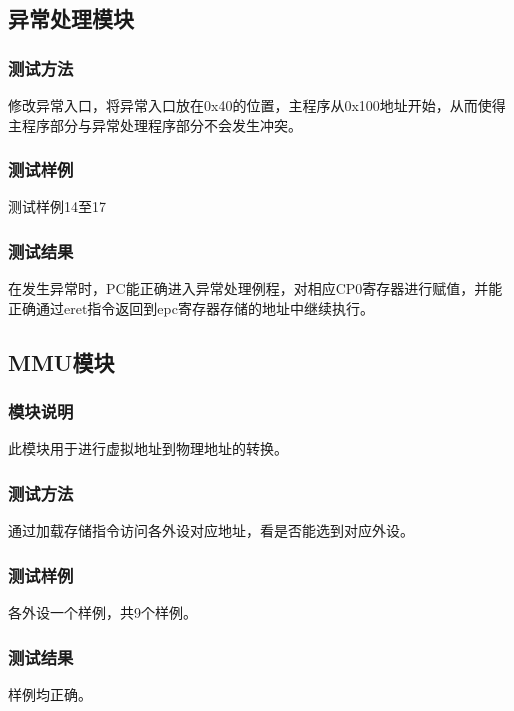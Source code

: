 \subsection{异常处理模块}
\subsubsection{测试方法}

修改异常入口，将异常入口放在0x40的位置，主程序从0x100地址开始，从而使得主程序部分与异常处理程序部分不会发生冲突。

\subsubsection{测试样例}

测试样例14至17

\subsubsection{测试结果}

在发生异常时，PC能正确进入异常处理例程，对相应CP0寄存器进行赋值，并能正确通过eret指令返回到epc寄存器存储的地址中继续执行。

\subsection{MMU模块}
\subsubsection{模块说明}

此模块用于进行虚拟地址到物理地址的转换。

\subsubsection{测试方法}

通过加载存储指令访问各外设对应地址，看是否能选到对应外设。

\subsubsection{测试样例}

各外设一个样例，共9个样例。

\subsubsection{测试结果}

样例均正确。